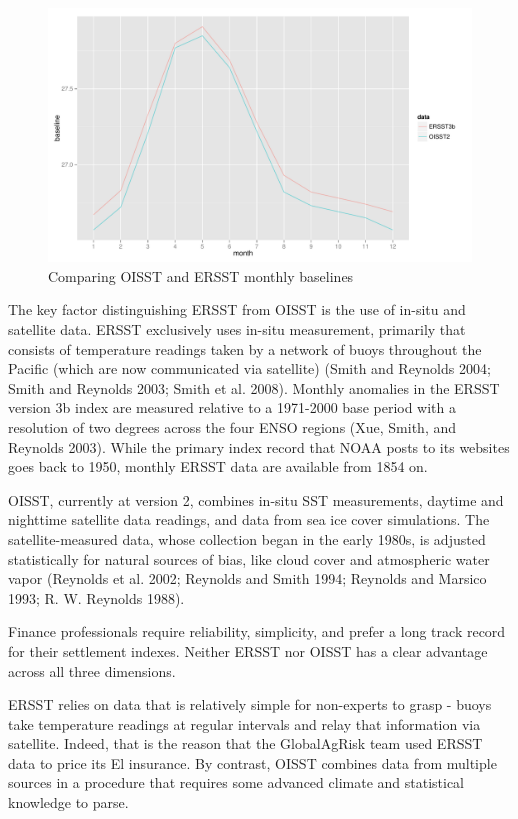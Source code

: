 \documentclass[article]{jss}
\begin{document}
\begin{figure}[!htbp]
\begin{center}
  \includegraphics[width=\linewidth]{img/CompareOISSTandERRSTbaselines.pdf}
  \caption{Comparing OISST and ERSST monthly baselines}
   \label{fig:baeslinesOIER}
   \end{center}
\end{figure}

The key factor distinguishing ERSST from OISST is the use of in-situ and
satellite data. ERSST exclusively uses in-situ measurement, primarily
that consists of temperature readings taken by a network of buoys
throughout the Pacific (which are now communicated via satellite) (Smith
and Reynolds 2004; Smith and Reynolds 2003; Smith et al. 2008). Monthly
anomalies in the ERSST version 3b index are measured relative to a
1971-2000 base period with a resolution of two degrees across the four
ENSO regions (Xue, Smith, and Reynolds 2003). While the primary index
record that NOAA posts to its websites goes back to 1950, monthly ERSST
data are available from 1854 on.

OISST, currently at version 2, combines in-situ SST measurements,
daytime and nighttime satellite data readings, and data from sea ice
cover simulations. The satellite-measured data, whose collection began
in the early 1980s, is adjusted statistically for natural sources of
bias, like cloud cover and atmospheric water vapor (Reynolds et al.
2002; Reynolds and Smith 1994; Reynolds and Marsico 1993; R. W. Reynolds
1988).

Finance professionals require reliability, simplicity, and prefer a long
track record for their settlement indexes. Neither ERSST nor OISST has a
clear advantage across all three dimensions.

ERSST relies on data that is relatively simple for non-experts to grasp
- buoys take temperature readings at regular intervals and relay that
information via satellite. Indeed, that is the reason that the
GlobalAgRisk team used ERSST data to price its El 
insurance. By contrast, OISST combines data from multiple sources in a
procedure that requires some advanced climate and statistical knowledge
to parse.
\end{document}
